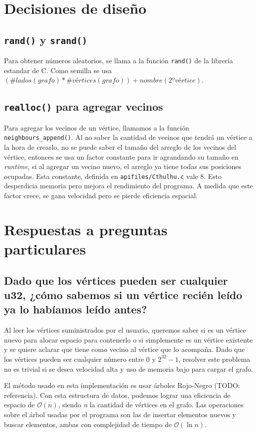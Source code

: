 \documentclass[11pt]{article}   	%
\begin{document}
\section{Decisiones de diseño}
\subsection{\texttt{rand()} y \texttt{srand()}}
Para obtener números aleatorios, se llama a la función \texttt{rand()} de la librería estandar de C. Como semilla se usa
$(\#lados(grafo) * \#vértices(grafo)) + nombre(2ºvértice)$.

\subsection{\texttt{realloc()} para agregar vecinos}
Para agregar los vecinos de un vértice, llamamos a la función \texttt{neighbours\_append()}. Al no saber la cantidad de vecinos que tendrá
un vértice a la hora de crearlo, no se puede saber el tamaño del arreglo de los vecinos del vértice, entonces se usa un factor constante para ir
agrandando su tamaño en \emph{runtime}, si al agregar un vecino nuevo, el arreglo ya tiene todas sus posiciones ocupadas. Esta constante, definida en
\texttt{apifiles/Cthulhu.c} vale 8. Esto desperdicia memoria pero mejora el rendimiento del programa. A medida que este factor crece, se gana velocidad
pero se pierde eficiencia espacial.
\clearpage

\section{Respuestas a preguntas particulares}
\subsection{Dado que los vértices pueden ser cualquier u32, ¿cómo sabemos si un vértice recién leído ya
lo habíamos leído antes?}
Al leer los vértices suministrados
por el usuario, queremos saber si es un vértice nuevo para alocar espacio para contenerlo o si simplemente
es un vértice existente y se quiere aclarar que tiene como vecino al vértice que lo acompaña.
Dado que los vértices pueden ser cualquier número entre 0 y $2^{32}-1$, resolver este problema no es trivial
si se desea velocidad alta y uso de memoria bajo para cargar el grafo.

El método usado en esta implementación es usar árboles Rojo-Negro (TODO: referencia). Con esta estructura
de datos, podemos lograr una eficiencia de espacio de $\mathcal{O}(n)$, siendo \emph{n} la cantidad de
vértices en el grafo. Las operaciones sobre el árbol usadas por el programa son las de insertar elementos
nuevos y buscar elementos, ambas con complejidad de tiempo de $\mathcal{O}(\ln{n})$.
\end{document}
